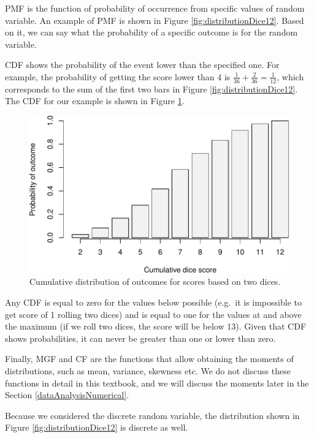 \documentclass[
]{book}
\theoremstyle{definition}
\theoremstyle{definition}
\theoremstyle{definition}
\theoremstyle{definition}
\theoremstyle{remark}
\begin{document}
PMF is the function of probability of occurrence from specific values of random variable. An example of PMF is shown in Figure \ref{fig:distributionDice12}. Based on it, we can say what the probability of a specific outcome is for the random variable.

CDF shows the probability of the event lower than the specified one. For example, the probability of getting the score lower than 4 is \(\frac{1}{36}+\frac{2}{36}=\frac{1}{12}\), which corresponds to the sum of the first two bars in Figure \ref{fig:distributionDice12}. The CDF for our example is shown in Figure \ref{fig:distributionDice12CDF}.

\begin{figure}
\centering
\includegraphics{Svetunkov---Statistics-for-Business-Analytics_files/figure-latex/distributionDice12CDF-1.pdf}
\caption{\label{fig:distributionDice12CDF}Cumulative distribution of outcomes for scores based on two dices.}
\end{figure}

Any CDF is equal to zero for the values below possible (e.g.~it is impossible to get score of 1 rolling two dices) and is equal to one for the values at and above the maximum (if we roll two dices, the score will be below 13). Given that CDF shows probabilities, it can never be greater than one or lower than zero.

Finally, MGF and CF are the functions that allow obtaining the moments of distributions, such as mean, variance, skewness etc. We do not discuss these functions in detail in this textbook, and we will discuss the moments later in the Section \ref{dataAnalysisNumerical}.

Because we considered the discrete random variable, the distribution shown in Figure \ref{fig:distributionDice12} is discrete as well.
\end{document}
